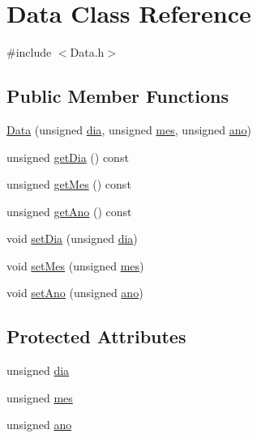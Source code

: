 \hypertarget{class_data}{\section{Data Class Reference}
\label{class_data}
}


{\ttfamily \#include $<$Data.\+h$>$}

\subsection*{Public Member Functions}
\begin{DoxyCompactItemize}
\item 
\hyperlink{class_data_ab1e8f6ca4094cbf13062f243fa2bb90b}{Data} (unsigned \hyperlink{class_data_afd7c86fbe8808298e8ac555d15374c97}{dia}, unsigned \hyperlink{class_data_a52f02cba5bf54c79dc1dd93545d27e5f}{mes}, unsigned \hyperlink{class_data_a662fc8d7cc87332b0204470c21b08383}{ano})
\item 
unsigned \hyperlink{class_data_a07fe748ec046cb904c6854fb8b792786}{get\+Dia} () const 
\item 
unsigned \hyperlink{class_data_a070387c9894b966ec8a175e3eb3c9c06}{get\+Mes} () const 
\item 
unsigned \hyperlink{class_data_a31f649c5a854de4750506a163955bb0b}{get\+Ano} () const 
\item 
void \hyperlink{class_data_ab3ea08211198373060bfd9aa7530ddff}{set\+Dia} (unsigned \hyperlink{class_data_afd7c86fbe8808298e8ac555d15374c97}{dia})
\item 
void \hyperlink{class_data_ac886172612a1bd81f1d266c4f5f94377}{set\+Mes} (unsigned \hyperlink{class_data_a52f02cba5bf54c79dc1dd93545d27e5f}{mes})
\item 
void \hyperlink{class_data_a5ad712f23c932ee4d515213f7c66f60e}{set\+Ano} (unsigned \hyperlink{class_data_a662fc8d7cc87332b0204470c21b08383}{ano})
\end{DoxyCompactItemize}
\subsection*{Protected Attributes}
\begin{DoxyCompactItemize}
\item 
unsigned \hyperlink{class_data_afd7c86fbe8808298e8ac555d15374c97}{dia}
\item 
unsigned \hyperlink{class_data_a52f02cba5bf54c79dc1dd93545d27e5f}{mes}
\item 
unsigned \hyperlink{class_data_a662fc8d7cc87332b0204470c21b08383}{ano}
\end{DoxyCompactItemize}


